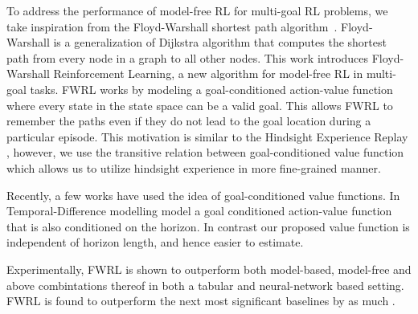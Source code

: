 To address the performance of model-free RL for multi-goal RL problems, we take
inspiration from the Floyd-Warshall shortest path algorithm~\cite{floydwarshall1962}.
Floyd-Warshall is a generalization of Dijkstra algorithm that computes the
shortest path from every node in a graph to all other nodes.
This work introduces Floyd-Warshall Reinforcement Learning, a new algorithm for
model-free RL in multi-goal tasks. FWRL works by
modeling a goal-conditioned action-value function where every state in the state
space can be a valid goal. This allows FWRL to remember the paths even if they
do not lead to the goal location during a particular episode. This motivation is
similar to the Hindsight Experience Replay \cite{anderson2017vision}, however,
we use the transitive relation between goal-conditioned value function which
allows us to utilize hindsight experience in more fine-grained manner.

Recently, a few works have used the idea of goal-conditioned value functions. In
Temporal-Difference modelling \cite{pong2018temporal} model a goal conditioned
action-value function that is also conditioned on the horizon. In contrast our
proposed value function is independent of horizon length, and hence easier to
estimate.

Experimentally, FWRL is shown to outperform both model-based, model-free
and above combintations thereof in both a tabular and neural-network
based setting. FWRL is found to outperform the next most significant
baselines by as much .


